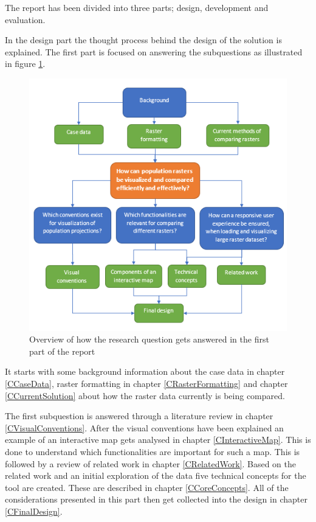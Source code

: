 %
%

The report has been divided into three parts; design, development and evaluation.

In the design part the thought process behind the design of the solution is explained.
The first part is focused on answering the subquestions as illustrated in figure \ref{Structure}. 


\begin{figure} [H]
	\centering
	\includegraphics[width=1\textwidth]{Pictures/ReportStructure}
	\caption{Overview of how the research question gets answered in the first part of the report}
	\label{Structure}
\end{figure}

It starts with some background information about the case data in chapter \ref{CCaseData}, raster formatting in chapter \ref{CRasterFormatting} and chapter \ref{CCurrentSolution} about how the raster data currently is being compared. 

The first subquestion is answered through a literature review in chapter \ref{CVisualConventions}. After the visual conventions have been explained an example of an interactive map gets analysed in chapter \ref{CInteractiveMap}. This is done to understand which functionalities are important for such a map. This is followed by a review of related work in chapter \ref{CRelatedWork}. Based on the related work and an initial exploration of the data five technical concepts for the tool are created. These are described in chapter \ref{CCoreConcepts}. All of the considerations presented in this part then get collected into the design in chapter \ref{CFinalDesign}. 

